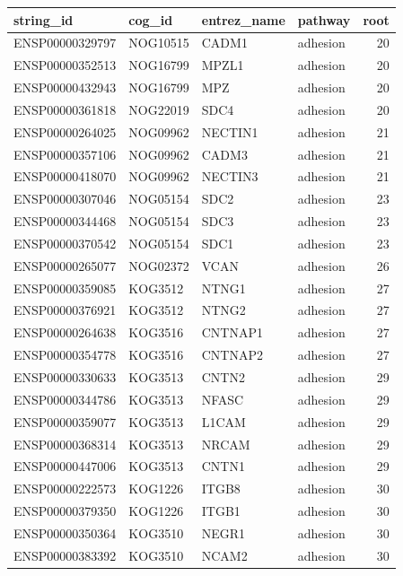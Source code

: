\begin{tabular}{llllr}
\toprule
string\_id & cog\_id & entrez\_name & pathway & root\\
\midrule
\rowcolor{gray!6}  ENSP00000329797 & NOG10515 & CADM1 & adhesion & 20\\
ENSP00000352513 & NOG16799 & MPZL1 & adhesion & 20\\
\rowcolor{gray!6}  ENSP00000432943 & NOG16799 & MPZ & adhesion & 20\\
ENSP00000361818 & NOG22019 & SDC4 & adhesion & 20\\
\rowcolor{gray!6}  ENSP00000264025 & NOG09962 & NECTIN1 & adhesion & 21\\
\addlinespace
ENSP00000357106 & NOG09962 & CADM3 & adhesion & 21\\
\rowcolor{gray!6}  ENSP00000418070 & NOG09962 & NECTIN3 & adhesion & 21\\
ENSP00000307046 & NOG05154 & SDC2 & adhesion & 23\\
\rowcolor{gray!6}  ENSP00000344468 & NOG05154 & SDC3 & adhesion & 23\\
ENSP00000370542 & NOG05154 & SDC1 & adhesion & 23\\
\addlinespace
\rowcolor{gray!6}  ENSP00000265077 & NOG02372 & VCAN & adhesion & 26\\
ENSP00000359085 & KOG3512 & NTNG1 & adhesion & 27\\
\rowcolor{gray!6}  ENSP00000376921 & KOG3512 & NTNG2 & adhesion & 27\\
ENSP00000264638 & KOG3516 & CNTNAP1 & adhesion & 27\\
\rowcolor{gray!6}  ENSP00000354778 & KOG3516 & CNTNAP2 & adhesion & 27\\
\addlinespace
ENSP00000330633 & KOG3513 & CNTN2 & adhesion & 29\\
\rowcolor{gray!6}  ENSP00000344786 & KOG3513 & NFASC & adhesion & 29\\
ENSP00000359077 & KOG3513 & L1CAM & adhesion & 29\\
\rowcolor{gray!6}  ENSP00000368314 & KOG3513 & NRCAM & adhesion & 29\\
ENSP00000447006 & KOG3513 & CNTN1 & adhesion & 29\\
\addlinespace
\rowcolor{gray!6}  ENSP00000222573 & KOG1226 & ITGB8 & adhesion & 30\\
ENSP00000379350 & KOG1226 & ITGB1 & adhesion & 30\\
\rowcolor{gray!6}  ENSP00000350364 & KOG3510 & NEGR1 & adhesion & 30\\
ENSP00000383392 & KOG3510 & NCAM2 & adhesion & 30\\

\end{tabular}
